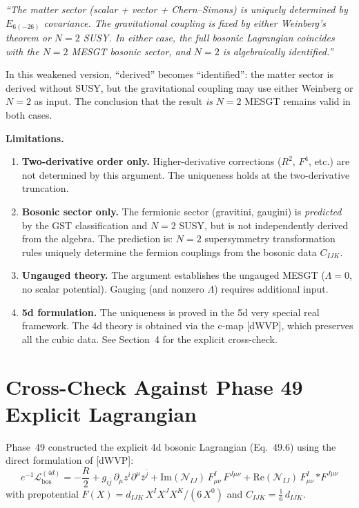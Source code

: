 \textit{``The matter sector (scalar + vector + Chern--Simons) is uniquely
determined by $E_{6(-26)}$ covariance. The gravitational coupling is
fixed by either Weinberg's theorem or $N=2$ SUSY. In either case, the
full bosonic Lagrangian coincides with the $N=2$ MESGT bosonic sector,
and $N=2$ is algebraically identified.''}

In this weakened version, ``derived'' becomes ``identified'': the matter
sector is derived without SUSY, but the gravitational coupling may use
either Weinberg or $N=2$ as input. The conclusion that the result \emph{is}
$N=2$ MESGT remains valid in both cases.

\textbf{Limitations.}
\begin{enumerate}
  \item \textbf{Two-derivative order only.} Higher-derivative corrections
    ($R^2$, $F^4$, etc.) are not determined by this argument.
    The uniqueness holds at the two-derivative truncation.
  \item \textbf{Bosonic sector only.} The fermionic sector (gravitini,
    gaugini) is \emph{predicted} by the GST classification and $N=2$
    SUSY, but is not independently derived from the algebra.
    The prediction is: $N=2$ supersymmetry transformation rules uniquely
    determine the fermion couplings from the bosonic data $C_{IJK}$.
  \item \textbf{Ungauged theory.} The argument establishes the
    ungauged MESGT ($\Lambda = 0$, no scalar potential).
    Gauging (and nonzero $\Lambda$) requires additional input.
  \item \textbf{5d formulation.} The uniqueness is proved in the 5d
    very special real framework. The 4d theory is obtained via the
    c-map [dWVP], which preserves all the cubic data. See Section~4
    for the explicit cross-check.
\end{enumerate}



\section{Cross-Check Against Phase 49 Explicit Lagrangian}

Phase~49 constructed the explicit 4d bosonic Lagrangian (Eq.~49.6) using
the direct formulation of [dWVP]:
\begin{equation}\label{eq:49.6-recall}
  e^{-1}\mathcal{L}_{\mathrm{bos}}^{(4d)} = -\frac{R}{2}
    + g_{i\bar{j}}\,\partial_\mu z^i \partial^\mu \bar{z}^{\bar{j}}
    + \mathrm{Im}(\mathcal{N}_{IJ})\,F^I_{\mu\nu}\,F^{J\mu\nu}
    + \mathrm{Re}(\mathcal{N}_{IJ})\,F^I_{\mu\nu}\,{*F}^{J\mu\nu}
\end{equation}
with prepotential $F(X) = d_{IJK}\,X^I X^J X^K / (6\,X^0)$ and
$C_{IJK} = \frac{1}{6}\,d_{IJK}$.

